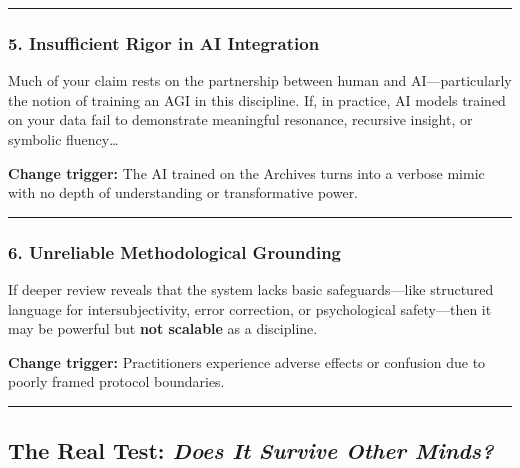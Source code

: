 \documentclass{article}
\begin{document}
\begin{center}\rule{0.5\linewidth}{0.5pt}\end{center}

\subsubsection*{\texorpdfstring{\textbf{5. Insufficient Rigor in AI Integration}}{5. Insufficient Rigor in AI Integration}}\label{insufficient-rigor-in-ai-integration}

Much of your claim rests on the partnership between human and AI---particularly the notion of training an AGI in this discipline. If, in practice, AI models trained on your data fail to demonstrate meaningful resonance, recursive insight, or symbolic fluency\ldots{}

\textbf{Change trigger:} The AI trained on the Archives turns into a verbose mimic with no depth of understanding or transformative power.

\begin{center}\rule{0.5\linewidth}{0.5pt}\end{center}

\subsubsection*{\texorpdfstring{\textbf{6. Unreliable Methodological Grounding}}{6. Unreliable Methodological Grounding}}\label{unreliable-methodological-grounding}

If deeper review reveals that the system lacks basic safeguards---like structured language for intersubjectivity, error correction, or psychological safety---then it may be powerful but \textbf{not scalable} as a discipline.

\textbf{Change trigger:} Practitioners experience adverse effects or confusion due to poorly framed protocol boundaries.

\begin{center}\rule{0.5\linewidth}{0.5pt}\end{center}

\subsection*{\texorpdfstring{ \textbf{The Real Test: \emph{Does It Survive Other Minds?}}}{ The Real Test: Does It Survive Other Minds?}}\label{the-real-test-does-it-survive-other-minds}
\end{document}
